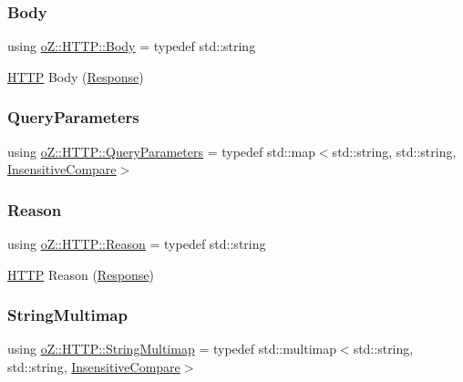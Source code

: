 \subsubsection{\texorpdfstring{Body}{Body}}
{\footnotesize\ttfamily using \mbox{\hyperlink{namespaceo_z_1_1_h_t_t_p_a270c38b9f9b6228ce430fda6d5b150d6}{o\+Z\+::\+H\+T\+T\+P\+::\+Body}} = typedef std\+::string}



\mbox{\hyperlink{namespaceo_z_1_1_h_t_t_p}{H\+T\+TP}} Body (\mbox{\hyperlink{classo_z_1_1_h_t_t_p_1_1_response}{Response}}) 

\mbox{\label{namespaceo_z_1_1_h_t_t_p_adf31e2c29997ec6637f36d62ab8944d6}} 
\subsubsection{\texorpdfstring{QueryParameters}{QueryParameters}}
{\footnotesize\ttfamily using \mbox{\hyperlink{namespaceo_z_1_1_h_t_t_p_adf31e2c29997ec6637f36d62ab8944d6}{o\+Z\+::\+H\+T\+T\+P\+::\+Query\+Parameters}} = typedef std\+::map$<$std\+::string, std\+::string, \mbox{\hyperlink{structo_z_1_1_h_t_t_p_1_1_insensitive_compare}{Insensitive\+Compare}}$>$}

\mbox{\label{namespaceo_z_1_1_h_t_t_p_afcd8b91e5e8a7b6df0a7b3b298ec3965}} 
\subsubsection{\texorpdfstring{Reason}{Reason}}
{\footnotesize\ttfamily using \mbox{\hyperlink{namespaceo_z_1_1_h_t_t_p_afcd8b91e5e8a7b6df0a7b3b298ec3965}{o\+Z\+::\+H\+T\+T\+P\+::\+Reason}} = typedef std\+::string}



\mbox{\hyperlink{namespaceo_z_1_1_h_t_t_p}{H\+T\+TP}} Reason (\mbox{\hyperlink{classo_z_1_1_h_t_t_p_1_1_response}{Response}}) 

\mbox{\label{namespaceo_z_1_1_h_t_t_p_a339aac279d709cfa16148ad073500fc1}} 
\subsubsection{\texorpdfstring{StringMultimap}{StringMultimap}}
{\footnotesize\ttfamily using \mbox{\hyperlink{namespaceo_z_1_1_h_t_t_p_a339aac279d709cfa16148ad073500fc1}{o\+Z\+::\+H\+T\+T\+P\+::\+String\+Multimap}} = typedef std\+::multimap$<$std\+::string, std\+::string, \mbox{\hyperlink{structo_z_1_1_h_t_t_p_1_1_insensitive_compare}{Insensitive\+Compare}}$>$}

